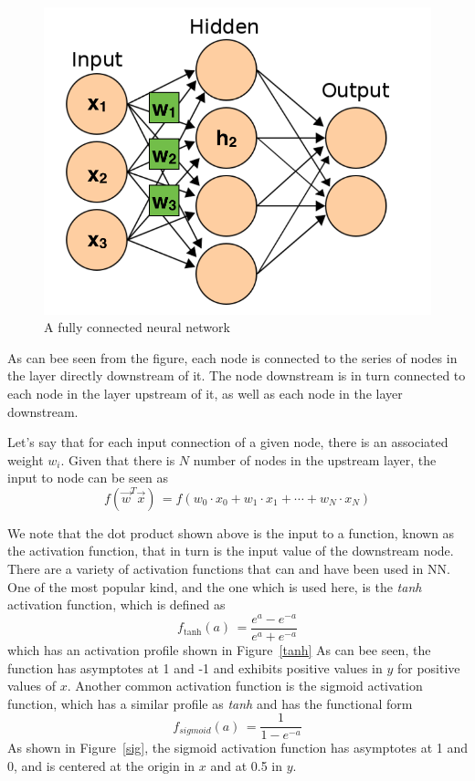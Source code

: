 \documentclass[letterpaper,12pt]{article}
\newcommand{\figref}[1]{Figure~\ref{#1}}
\begin{document}
\begin{figure}[htbp]
\begin{center}
\includegraphics[scale=0.5]{images/nn_edit.png}
\caption{A fully connected neural network \cite{ann}}
\label{ann}
\end{center}
\end{figure}

As can bee seen from the figure, each node is connected to the series of nodes in the layer directly downstream of it. The node downstream is in turn connected to each node in the layer upstream of it, as well as each node in the layer downstream.

Let's say that for each input connection of a given node, there is an associated weight $w_i$. Given that there is $N$ number of nodes in the upstream layer, the input to node can be seen as 
\begin{equation}
f(\vec{w}^T\vec{x}) \, = f(w_0 \cdot x_0 + w_1 \cdot x_1 + \cdots + w_N \cdot x_N)
\end{equation}

We note that the dot product shown above is the input to a function, known as the activation function, that in turn is the input value of the downstream node. There are a variety of activation functions that can and have been used in NN. One of the most popular kind, and the one which is used here, is the \textit{tanh} activation function, which is defined as
\begin{equation}
f_{\text{tanh}}(a) \, = \frac{e^a-e^{-a}}{e^a+e^{-a}}
\end{equation}
which has an activation profile shown in \figref{tanh} As can bee seen, the function has asymptotes  at 1 and -1 and exhibits positive values in $y$ for positive values of $x$. Another common activation function is the sigmoid activation function, which has a similar profile as \textit{tanh} and has the functional form
\begin{equation}
f_{sigmoid}(a) \, = \frac{1}{1-e^{-a}}
\end{equation}
As shown in \figref{sig}, the sigmoid activation function has asymptotes at 1 and 0, and is centered at the origin in $x$ and at 0.5 in $y$. 
\end{document}
